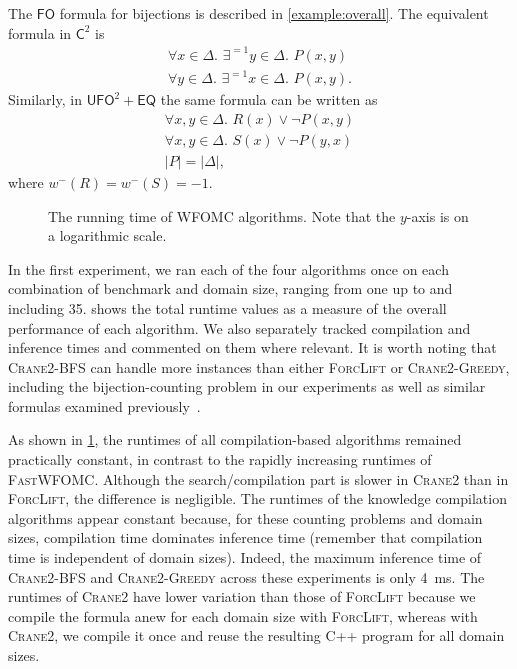 \documentclass{article}
\theoremstyle{remark}
\newcommand{\Ctwo}{$\mathsf{C}^{2}$}
\newcommand{\FO}{$\mathsf{FO}$}
\newcommand{\UFO}{$\mathsf{UFO}^{2} + \mathsf{EQ}$}
\newcommand{\Cranetwo}{\textsc{Crane2}}
\newcommand{\Cranebfs}{\textsc{Crane2-BFS}}
\newcommand{\Cranegreedy}{\textsc{Crane2-Greedy}}
\begin{document}
The \FO{} formula for bijections is described in \cref{example:overall}. The
equivalent formula in \Ctwo{} is
\begin{gather*}
  \forall x \in \Delta\text{. }\exists^{=1} y \in \Delta\text{. }P(x, y)\\
  \forall y \in \Delta\text{. }\exists^{=1} x \in \Delta\text{. }P(x, y).
\end{gather*}
Similarly, in \UFO{} the same formula can be written as
\begin{gather*}
  \forall x, y \in \Delta\text{. }R(x) \lor \neg P(x, y)\\
  \forall x, y \in \Delta\text{. }S(x) \lor \neg P(y, x)\\
  |P| = |\Delta|,
\end{gather*}
where $w^{-}(R) = w^{-}(S) = -1$.

\begin{figure}[t]
  \centering
  
  \caption{The running time of WFOMC algorithms. Note that the $y$-axis is on a
    logarithmic scale.}\label{fig:plot}
\end{figure}

In the first experiment, we ran each of the four algorithms once on each
combination of benchmark and domain size, ranging from one up to and including
35.  shows the total runtime values as a measure of the overall
performance of each algorithm. We also separately tracked compilation and
inference times and commented on them where relevant. It is worth noting that
\Cranebfs{} can handle more instances than either \textsc{ForcLift} or
\Cranegreedy{}, including the bijection-counting problem in our experiments as
well as similar formulas examined previously~\cite{DBLP:conf/kr/DilkasB23}.

As shown in \cref{fig:plot}, the runtimes of all compilation-based algorithms
remained practically constant, in contrast to the rapidly increasing runtimes of
\textsc{FastWFOMC}. Although the search/compilation part is slower in
\Cranetwo{} than in \textsc{ForcLift}, the difference is negligible. The
runtimes of the knowledge compilation algorithms appear constant because, for
these counting problems and domain sizes, compilation time dominates inference
time (remember that compilation time is independent of domain sizes). Indeed,
the maximum inference time of \Cranebfs{} and \Cranegreedy{} across these
experiments is only \SI{4}{\milli\second}. The runtimes of \Cranetwo{} have
lower variation than those of \textsc{ForcLift} because we compile the formula
anew for each domain size with \textsc{ForcLift}, whereas with \Cranetwo{}, we
compile it once and reuse the resulting C++ program for all domain sizes.
\end{document}
